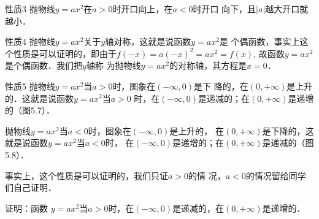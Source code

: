 \begin{blk}{性质3}
抛物线$y=ax^2$在$a>0$时开口向上，在$a<0$时开口
向下，且$|a|$越大开口就越小．
\end{blk}

\begin{blk}{性质4}
抛物线$y=ax^2$关于$y$轴对称，这就是说函数$y=ax^2$是
个偶函数，事实上这个性质是可以证明的，即由于$f(-x)=
a(-x)^2=ax^2=f(x)$, 故函数$y=ax^2$是个偶函数．我们把$y$轴称
为抛物线$y=ax^2$的对称轴，其方程是$x=0$．
\end{blk}

\begin{blk}{性质5}
抛物线$y=ax^2$当$a>0$时，图象在$(-\infty,0)$是下
降的，在$(0,+\infty)$是上升的．这就是说函数$y=ax^2$当$a>0$
时，在$(-\infty,0)$是递减的；在$(0,+\infty)$是递增的（图5.7）．

抛物线$y=ax^2$当$a<0$时，图象在$(-\infty,0)$是上升的，
在$(0,+\infty)$是下降的，这就是说函数$y=ax^2$当$a<0$时，
在$(-\infty,0)$是递增的；在$(0,+\infty)$是递减的（图5.8）．
\end{blk}

\begin{figure}[htp]\centering
    \begin{minipage}[t]{0.48\textwidth}
    \centering
{}
    \caption{}
    \end{minipage}
    \begin{minipage}[t]{0.48\textwidth}
    \centering
    \caption{}
    \end{minipage}
    \end{figure}

事实上，这个性质是可以证明的，我们只证$a>0$的情
况，$a<0$的情况留给同学们自己证明．

证明：函数 $y=ax^2$当$a>0$时，在$(-\infty,0)$是递减的，在$(0,+\infty)$是递增的．

